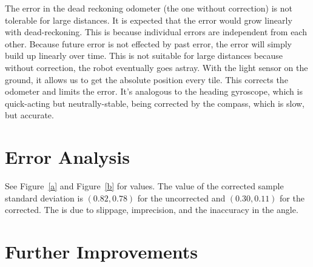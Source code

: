 \documentclass[twocolumn]{article}
\begin{document}
The error in the dead reckoning odometer (the one without correction) is not tolerable for large distances. It is expected that the error would grow linearly with dead-reckoning. This is because individual errors are independent from each other. Because future error is not effected by past error, the error will simply build up linearly over time. This is not suitable for large distances because without correction, the robot eventually goes astray. With the light sensor on the ground, it allows us to get the absolute position every tile. This corrects the odometer and limits the error. It's analogous to the heading gyroscope, which is quick-acting but neutrally-stable, being corrected by the compass, which is slow, but accurate.

\section{Error Analysis}

See Figure~\ref{a} and Figure~\ref{b} for values. The value
of the corrected sample standard deviation is $(0.82, 0.78)$ for
the uncorrected and $(0.30, 0.11)$ for the corrected. The is due to slippage, imprecision, and the inaccuracy in the angle.

\section{Further Improvements}
\end{document}

